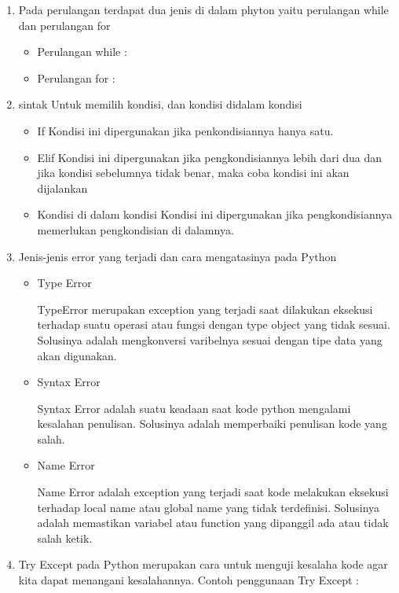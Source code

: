\begin{enumerate}
\item  Pada perulangan terdapat dua jenis di dalam phyton yaitu perulangan while dan perulangan for
\begin{itemize}
    \item Perulangan while :
    
    \item Perulangan for :
    
\end{itemize}

\item sintak Untuk memilih kondisi, dan kondisi didalam kondisi
\begin{itemize}

\item If
Kondisi ini dipergunakan jika penkondisiannya hanya satu.


\item Elif
Kondisi ini dipergunakan jika pengkondisiannya lebih dari dua dan jika kondisi sebelumnya tidak benar, maka coba kondisi ini akan dijalankan


\item Kondisi di dalam kondisi
Kondisi ini dipergunakan jika pengkondisiannya memerlukan pengkondisian di dalamnya.

\end{itemize}
 
\item Jenis-jenis error yang terjadi dan cara mengatasinya pada Python
\begin{itemize}
    \item Type Error
    \par TypeError merupakan exception yang terjadi saat dilakukan eksekusi terhadap suatu operasi atau fungsi dengan type object yang tidak sesuai. Solusinya adalah mengkonversi varibelnya sesuai dengan tipe data yang akan digunakan.
    \item Syntax Error
    \par Syntax Error adalah suatu keadaan saat kode python mengalami kesalahan penulisan. Solusinya adalah memperbaiki penulisan kode yang salah.
    \item Name Error
    \par Name Error adalah exception yang terjadi saat kode melakukan eksekusi terhadap local name atau global name yang tidak terdefinisi. Solusinya adalah memastikan variabel atau function yang dipanggil ada atau tidak salah ketik.
\end{itemize}

\item Try Except pada Python merupakan cara untuk menguji kesalaha kode agar kita dapat menangani kesalahannya. Contoh penggunaan Try Except :


\end{enumerate}

